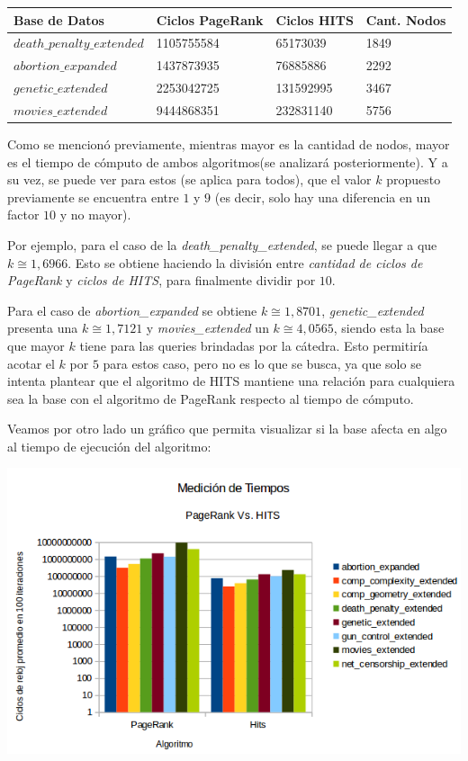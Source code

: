 \begin{center}
    \begin{tabular}{| l | l | l | l |}
    \hline
    Base de Datos & Ciclos PageRank & Ciclos HITS & Cant. Nodos \\ \hline
    $death\_penalty\_extended$ & 1105755584 & 65173039 & 1849 \\ \hline
    $abortion\_expanded$ & 1437873935 & 76885886 & 2292 \\ \hline
	$genetic\_extended$ & 2253042725 & 131592995 & 3467 \\ \hline
	$movies\_extended$ & 9444868351 & 232831140	& 5756 \\ \hline
    \end{tabular}
\end{center}

Como se mencionó previamente, mientras mayor es la cantidad de nodos, mayor es el tiempo de cómputo de ambos algoritmos(se analizará posteriormente). Y a su vez, se puede ver para estos (se aplica para todos), que el valor $k$ propuesto previamente se encuentra entre $1$ y $9$ (es decir, solo hay una diferencia en un factor $10$ y no mayor).
\par 
Por ejemplo, para el caso de la \textit{death\_penalty\_extended}, se puede llegar a que $k \cong 1,6966$. Esto se obtiene haciendo la división entre \textit{cantidad de ciclos de PageRank} y \textit{ciclos de HITS}, para finalmente dividir por $10$. 
\par 
Para el caso de \textit{abortion\_expanded} se obtiene $k \cong 1,8701$, \textit{genetic\_extended} presenta una $ k \cong 1,7121$ y \textit{movies\_extended} un $k \cong 4,0565$, siendo esta la base que mayor $k$ tiene para las queries brindadas por la cátedra. Esto permitiría acotar el $k$ por $5$ para estos caso, pero no es lo que se busca, ya que solo se intenta plantear que el algoritmo de HITS mantiene una relación para cualquiera sea la base con el algoritmo de PageRank respecto al tiempo de cómputo.

Veamos por otro lado un gráfico que permita visualizar si la base afecta en algo al tiempo de ejecución del algoritmo:

	\par 
	\begin{center}
		\includegraphics[scale=0.6]{./img/medicionesTiempo2.png}
	\end{center}
	
